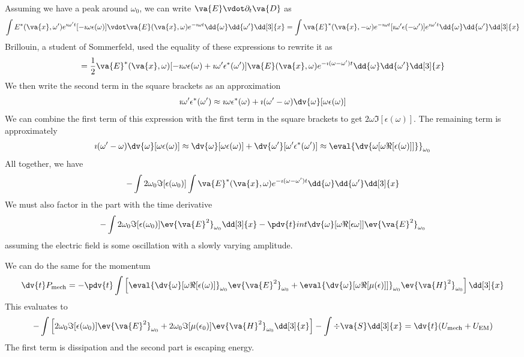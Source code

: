 \documentclass[a4paper,twoside,master.tex]{subfiles}
\begin{document}
Assuming we have a peak around $ \omega_0 $, we can write $ \va{E} \vdot \partial_t \va{D} $ as
\begin{equation}
    \int E^*( \va{x}, \omega') e^{\imath \omega' t} [- \imath \omega \epsilon(\omega)] \vdot \va{E}( \va{x}, \omega) e^{- \imath \omega t} \dd{\omega} \dd{\omega'} \dd[3]{x} = \int \va{E}^*( \va{x}, - \omega) e^{- \imath \omega t} [ \imath \omega' \epsilon(- \omega')] e^{\imath \omega' t} \dd{\omega} \dd{\omega'} \dd[3]{x}
\end{equation}
Brillouin, a student of Sommerfeld, used the equality of these expressions to rewrite it as
\begin{equation}
    = \frac{1}{2} \va{E}^*( \va{x}, \omega) [- \imath \omega \epsilon(\omega) + \imath \omega' \epsilon^*(\omega')] \va{E}( \va{x}, \omega) e^{- \imath (\omega - \omega')t} \dd{\omega} \dd{\omega'} \dd[3]{x}
\end{equation}
We then write the second term in the square brackets as an approximation
\begin{equation}
    \imath \omega' \epsilon^*(\omega') \approx \imath \omega \epsilon^*(\omega) + \imath (\omega' - \omega) \dv{\omega}[\omega \epsilon(\omega)]
\end{equation}
We can combine the first term of this expression with the first term in the square brackets to get $ 2 \omega \Im[\epsilon(\omega)] $. The remaining term is approximately
\begin{equation}
    \imath (\omega' - \omega) \dv{\omega}[\omega \epsilon(\omega)] \approx \dv{\omega}[\omega \epsilon(\omega)]+ \dv{\omega'}[\omega' \epsilon^*(\omega')] \approx \eval{\dv{\omega [\omega \Re[\epsilon(\omega)]]}}_{\omega_0}
\end{equation}
All together, we have
\begin{equation}
    - \int 2 \omega_0 \Im[\epsilon(\omega_0)] \int \va{E}^*( \va{x}, \omega) e^{- \imath (\omega - \omega')t} \dd{\omega} \dd{\omega'} \dd[3]{x}
\end{equation}
We must also factor in the part with the time derivative
\begin{equation}
    - \int 2 \omega_0 \Im[\epsilon(\omega_0)] \ev{ \va{E}^2}_{\omega_0} \dd[3]{x} - \pdv{t}int \dv{\omega}[\omega \Re[\epsilon \omega]] \ev{ \va{E}^2}_{\omega_0}
\end{equation}
assuming the electric field is some oscillation with a slowly varying amplitude.

We can do the same for the momentum
\begin{equation}
    \dv{t}P_{\text{mech}} = - \pdv{t} \int \left[ \eval{\dv{\omega}[\omega \Re[\epsilon(\omega)]}_{\omega_0} \ev{ \va{E}^2}_{\omega_0} + \eval{\dv{\omega}[\omega \Re[\mu(\epsilon)]]}_{\omega_0} \ev{ \va{H}^2}_{\omega_0} \right] \dd[3]{x}
\end{equation}
This evaluates to
\begin{equation}
    - \int \left[ 2 \omega_0 \Im[\epsilon(\omega_0)] \ev{ \va{E}^2}_{\omega_0} + 2 \omega_0 \Im[\mu(\epsilon_0)] \ev{ \va{H}^2}_{\omega_0} \dd[3]{x}\right] - \int \div{ \va{S}} \dd[3]{x} = \dv{t}(U_{\text{mech}} + U_{\text{EM}})
\end{equation}
The first term is dissipation and the second part is escaping energy.
\end{document}
